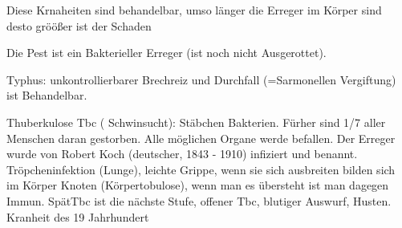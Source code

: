 \documentclass[a4paper]{article}
\begin{document}
Diese Krnaheiten sind behandelbar, umso länger die Erreger im Körper sind desto gröößer ist der Schaden

Die Pest ist ein Bakterieller Erreger (ist noch nicht Ausgerottet).

Typhus: unkontrollierbarer Brechreiz und Durchfall (=Sarmonellen Vergiftung) ist Behandelbar.

Thuberkulose Tbc ( Schwinsucht): Stäbchen Bakterien. Fürher sind 1/7 aller Menschen daran gestorben. Alle möglichen Organe werde befallen. Der Erreger wurde von Robert Koch (deutscher, 1843 - 1910) infiziert und benannt. Tröpcheninfektion (Lunge), leichte Grippe, wenn sie sich ausbreiten bilden sich im Körper Knoten (Körpertobulose), wenn man es übersteht ist man dagegen Immun. SpätTbc ist die nächste Stufe, offener Tbc, blutiger Auswurf, Husten. 
Kranheit des 19 Jahrhundert
\end{document}
